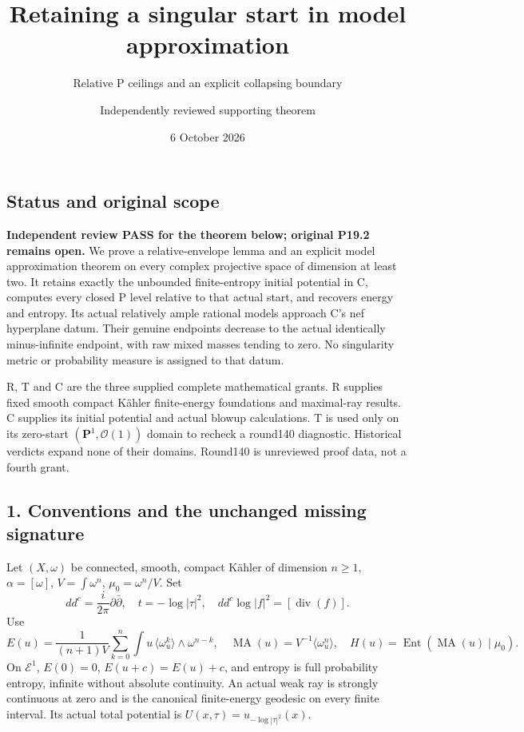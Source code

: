 \documentclass[
  11pt,
]{article}
\title{Retaining a singular start in model approximation}
\subtitle{Relative P ceilings and an explicit collapsing boundary}
\author{Independently reviewed supporting theorem}
\date{6 October 2026}
\begin{document}
\maketitle

\subsection{Status and original scope}\label{status-and-original-scope}

\textbf{Independent review PASS for the theorem below; original P19.2
remains open.} We prove a relative-envelope lemma and an explicit model
approximation theorem on every complex projective space of dimension at
least two. It retains exactly the unbounded finite-entropy initial
potential in C, computes every closed P level relative to that actual
start, and recovers energy and entropy. Its actual relatively ample
rational models approach C's nef hyperplane datum. Their genuine
endpoints decrease to the actual identically minus-infinite endpoint,
with raw mixed masses tending to zero. No singularity metric or
probability measure is assigned to that datum.

R, T and C are the three supplied complete mathematical grants. R
supplies fixed smooth compact Kähler finite-energy foundations and
maximal-ray results. C supplies its initial potential and actual blowup
calculations. T is used only on its zero-start
\((\mathbf P^1,\mathcal O(1))\) domain to recheck a round140 diagnostic.
Historical verdicts expand none of their domains. Round140 is unreviewed
proof data, not a fourth grant.

\subsection{1. Conventions and the unchanged missing
signature}\label{conventions-and-the-unchanged-missing-signature}

Let \((X,\omega)\) be connected, smooth, compact Kähler of dimension
\(n\ge1\), \(\alpha=[\omega]\), \(V=\int\omega^n\),
\(\mu_0=\omega^n/V\). Set \[
dd^c=\frac{i}{2\pi}\partial\bar\partial,\quad t=-\log|\tau|^2,\quad
dd^c\log|f|^2=[\operatorname{div}(f)].
\] Use \[
E(u)=\frac1{(n+1)V}\sum_{k=0}^n\int u\,
\langle\omega_u^k\rangle\wedge\omega^{n-k},\quad
\operatorname{MA}(u)=V^{-1}\langle\omega_u^n\rangle,\quad
H(u)=\operatorname{Ent}(\operatorname{MA}(u)\mid\mu_0).
\] On \(\mathcal E^1\), \(E(0)=0\), \(E(u+c)=E(u)+c\), and entropy is
full probability entropy, infinite without absolute continuity. An
actual weak ray is strongly continuous at zero and is the canonical
finite-energy geodesic on every finite interval. Its actual total
potential is \(U(x,\tau)=u_{-\log|\tau|^2}(x)\).
\end{document}
